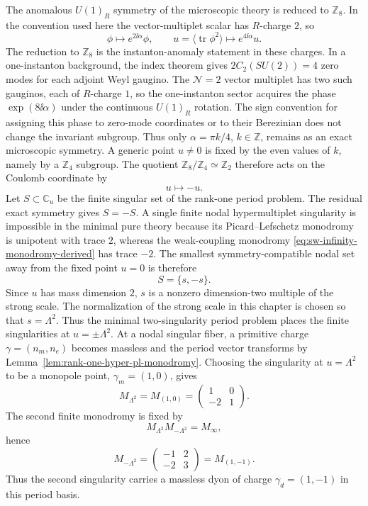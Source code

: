 The anomalous \(U(1)_R\) symmetry of the microscopic theory is reduced to
\(\mathbb Z_8\).  In the convention used here the vector-multiplet scalar has
\(R\)-charge \(2\), so
\[
  \phi\mapsto e^{2\ii\alpha}\phi,\qquad
  u=\langle\operatorname{tr}\phi^2\rangle
  \mapsto e^{4\ii\alpha}u .
\]
The reduction to \(\mathbb Z_8\) is the instanton-anomaly statement in these
charges.  In a one-instanton background, the index theorem gives
\(2C_2(SU(2))=4\) zero modes for each adjoint Weyl gaugino.  The
\(\mathcal N=2\) vector multiplet has two such gauginos, each of \(R\)-charge
\(1\), so the one-instanton sector acquires the phase \(\exp(8\ii\alpha)\)
under the continuous \(U(1)_R\) rotation.  The sign convention for assigning
this phase to zero-mode coordinates or to their Berezinian does not change the
invariant subgroup.  Thus only \(\alpha=\pi k/4\), \(k\in\mathbb Z\), remains
as an exact microscopic symmetry.  A generic point \(u\ne0\) is fixed by the
even values of \(k\),
namely by a \(\mathbb Z_4\) subgroup.  The quotient
\(\mathbb Z_8/\mathbb Z_4\simeq\mathbb Z_2\) therefore acts on the Coulomb
coordinate by
\[
  u\longmapsto -u .
\]
Let \(S\subset\mathbb C_u\) be the finite singular set of the rank-one period
problem.  The residual exact symmetry gives \(S=-S\).  A single finite nodal
hypermultiplet singularity is impossible in the minimal pure theory because
its Picard--Lefschetz monodromy is unipotent with trace \(2\), whereas the
weak-coupling monodromy \eqref{eq:sw-infinity-monodromy-derived} has trace
\(-2\).  The smallest symmetry-compatible nodal set away from the fixed point
\(u=0\) is therefore
\[
  S=\{s,-s\}.
\]
Since \(u\) has mass dimension \(2\), \(s\) is a nonzero dimension-two multiple
of the strong scale.  The normalization of the strong scale in this chapter is
chosen so that \(s=\Lambda^2\).  Thus the minimal two-singularity period
problem places the finite singularities at \(u=\pm\Lambda^2\).  At a nodal
singular fiber, a primitive
charge \(\gamma=(n_m,n_e)\) becomes massless and the period vector transforms
by Lemma~\ref{lem:rank-one-hyper-pl-monodromy}.  Choosing the
singularity at \(u=\Lambda^2\) to be a monopole point,
\(\gamma_m=(1,0)\), gives
\[
  M_{\Lambda^2}=M_{(1,0)}
  =
  \begin{pmatrix}
  1&0\\
  -2&1
  \end{pmatrix}.
\]
The second finite monodromy is fixed by
\[
  M_{\Lambda^2}M_{-\Lambda^2}=M_\infty,
\]
hence
\begin{equation}
  M_{-\Lambda^2}
  =
  \begin{pmatrix}
  -1&2\\
  -2&3
  \end{pmatrix}
  =
  M_{(1,-1)} .
  \label{eq:sw-dyon-monodromy-derived}
\end{equation}
Thus the second singularity carries a massless dyon of charge
\(\gamma_d=(1,-1)\) in this period basis.

